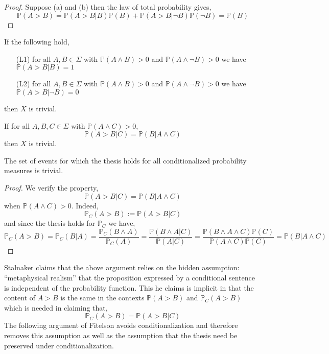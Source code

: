 \documentclass[12pt]{article}
\renewcommand{\P}{\mathbb{P}}
\begin{document}
\begin{proof}
Suppose (a) and (b) then the law of total probability gives,
\[ \P(A > B) = \P(A > B | B) \P(B) + \P(A > B | \neg B) \P(\neg B) = \P(B) \]
\end{proof}

\begin{cor}
If the following hold,
\begin{enumerate}
\item[(L1)] for all $A, B \in \Sigma$ with $\P(A \wedge B) > 0$ and $\P(A \wedge \neg B) > 0$ we have $\P(A > B | B) = 1$
\item[(L2)] for all $A, B \in \Sigma$ with $\P(A \wedge B) > 0$ and $\P(A \wedge \neg B) > 0$ we have $\P(A > B | \neg B) = 0$
\end{enumerate}
then $X$ is trivial.
\end{cor}

\begin{cor}
If for all $A, B, C \in \Sigma$ with $\P(A \wedge C) > 0$,
\[  \P(A > B | C) = \P(B | A \wedge C) \]
then $X$ is trivial.
\end{cor}

\begin{prop}[Lewis]
The set of events for which the thesis holds for all conditionalized probability measures is trivial. 
\end{prop}

\begin{proof}
We verify the property,
\[ \P(A > B | C) = \P(B | A \wedge C) \]
when $\P(A \wedge C) > 0$. Indeed,
\[ \P_C(A > B) := \P(A > B | C) \]
and since the thesis holds for $\P_C$ we have,
\[ \P_C(A > B) = \P_C(B|A) = \frac{\P_C(B \wedge A)}{\P_C(A)} = \frac{\P(B \wedge A | C)}{\P(A|C)} = \frac{\P(B \wedge A \wedge C) \P(C)}{\P(A \wedge C) \P(C)} = \P(B | A \wedge C) \]
\end{proof}

\begin{rmk}
Stalnaker claims that the above argument relies on the hidden assumption: ``metaphysical realism'' that the proposition expressed by a conditional sentence is independent of the probability function. This he claims is implicit in that the content of $A > B$ is the same in the contexts $\P(A > B)$ and $\P_C(A > B)$ which is needed in claiming that,
\[ \P_C(A > B) = \P(A > B | C) \]
The following argument of Fitelson avoids conditionalization and therefore removes this assumption as well as the assumption that the thesis need be preserved under conditionalization.
\end{rmk}
\end{document}
